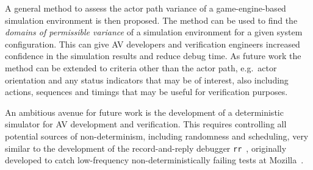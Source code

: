 \documentclass[letterpaper, 10 pt, journal, twoside]{IEEEtran}
\begin{document}
A general method to assess the actor path variance of a game-engine-based simulation environment is then proposed. The method can be used to find the \textit{domains of permissible variance} of a simulation environment for a given system configuration. This can give AV developers and verification engineers increased confidence in the simulation results and reduce debug time. 
% 
%
As future work the method can be extended to criteria other than the actor path, e.g.\ actor orientation and any status indicators that may be of interest, also including actions, sequences and timings that may be useful for verification purposes.

An ambitious avenue for future work is the development of a deterministic simulator for AV development and verification. This requires controlling all potential sources of non-determinism, including randomness and scheduling, very similar to the development of the record-and-reply debugger \texttt{rr}~\cite{RR_link}, originally developed to catch low-frequency non-deterministically failing tests at Mozilla~\cite{acm-q-rr-interview}.


\end{document}
